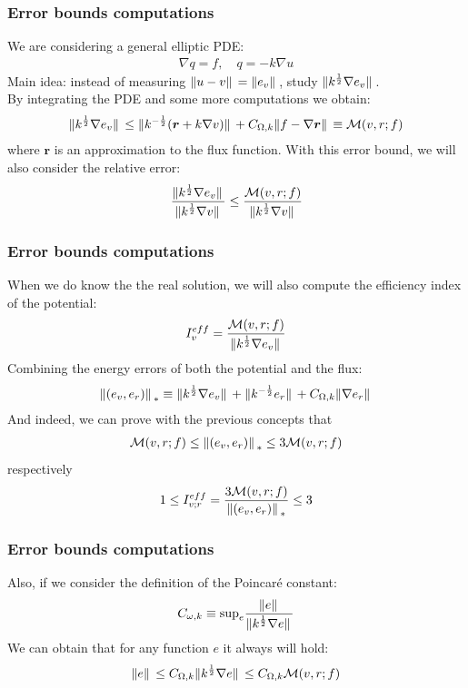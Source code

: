 \documentclass[t]{beamer}
\begin{document}
\begin{frame}
\frametitle{Error bounds computations}
We are considering a general elliptic PDE:
\begin{align*}
\nabla q = f , \quad q =-k \nabla u
\end{align*}
Main idea: instead of measuring $\norm*{u-v} = \norm*{e_v}$, study $\norm*{k^{\frac{1}{2}}\nabla e_v}$. 
\\ By integrating the PDE and some more computations we obtain:
\begin{align*}
\norm*{k^{\frac{1}{2}}\nabla e_v} \leq \norm*{k^{-\frac{1}{2}}(\bm{r}+k\nabla v)} + C_{\Omega,k}\norm*{f-\nabla \bm{r}} \equiv \mathcal{M}(v,r;f)
\end{align*}
where $\bm{r}$ is an approximation to the flux function.
With this error bound, we will also consider the \alert{relative error}:
\begin{align*}
\frac{\norm*{k^{\frac{1}{2}}\nabla e_v}}{\norm*{k^{\frac{1}{2}}\nabla v}} \leq \frac{\mathcal{M}(v,r;f)}{\norm*{k^{\frac{1}{2}}\nabla v}}
\end{align*}

\end{frame}

\begin{frame}
\frametitle{Error bounds computations}
When we do know the the real solution, we will also compute the \alert{efficiency index of the potential}:
\begin{align*}
I^{eff}_v = \frac{\mathcal{M}(v,r;f)}{\norm*{k^{\frac{1}{2}}\nabla e_v}}
\end{align*}
Combining the energy errors of both the potential and the flux:
\begin{align*}
\norm*{(e_v,e_r)}_{*} \equiv \norm*{k^{\frac{1}{2}}\nabla e_v} + \norm*{k^{-\frac{1}{2}}e_r} + C_{\Omega,k}\norm*{\nabla e_r}
\end{align*} 
And indeed, we can prove with the previous concepts that 
\begin{align*}
\mathcal{M}(v,r;f) \leq  \norm*{(e_v,e_r)}_{*}  \leq 3\mathcal{M}(v,r;f)
\end{align*}
respectively
\begin{align*}
1 \leq I^{eff}_{v;r} = \frac{3\mathcal{M}(v,r;f)}{\norm*{(e_v, e_r)}_*} \leq 3
\end{align*}
\end{frame}

\begin{frame}
\frametitle{Error bounds computations}
Also, if we consider the definition of the Poincaré constant:
\begin{align*}
C_{\omega,k} \equiv \mathrm{sup}_e \frac{\norm*{e}}{\norm*{k^{\frac{1}{2}}\nabla{e}}}
\end{align*}
We can obtain that for any function $e$ it always will hold:
\begin{align*}
\norm*{e} \leq C_{\Omega,k}\norm*{k^{\frac{1}{2}}\nabla{e}} \leq C_{\Omega,k}\mathcal{M}(v,r;f)
\end{align*}
\end{frame}
\end{document}

